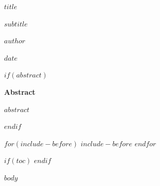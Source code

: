 \documentclass[$if(fontsize)$$fontsize$,$endif$a4paper,oneside]{report}
\begin{document}
\begin{titlepage}
    \centering
    \vspace*{2cm}
    {\Huge \bfseries $title$ \par}
    \vspace{1.5cm}
    {\Large $subtitle$ \par}
    \vspace{3cm}
    {\large \bfseries $author$ \par}
    \vspace{2cm}
    {\large $date$ \par}
    \vfill
    $if(abstract)$
    \begin{minipage}{0.8\textwidth}
    \textbf{Abstract} \par
    \vspace{0.5cm}
    $abstract$
    \end{minipage}
    $endif$
    \vfill
\end{titlepage}

$for(include-before)$
$include-before$
$endfor$

$if(toc)$
\tableofcontents
\newpage
$endif$

$body$
\end{document}
